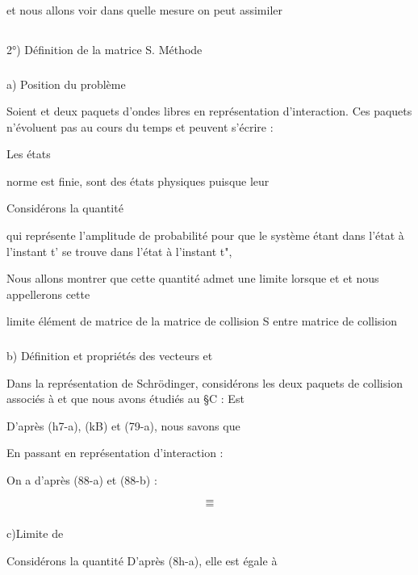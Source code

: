 {{{et nous allons voir dans quelle mesure on peut assimiler 


\subsection{}%
2°) Définition de la matrice S. Méthode

\subsubsection{}%
a) Position du problème

Soient  et  deux paquets d'ondes libres
en représentation d'interaction. Ces paquets n'évoluent pas au
cours du temps et peuvent s'écrire :

Les états 

norme est finie,
 sont des états physiques puisque leur

Considérons la quantité

qui représente l'amplitude de probabilité pour que le système
étant dans l'état  à l'instant t' se trouve dans l'état
à l'instant t",

Nous allons montrer que cette quantité admet une
limite lorsque  et  et nous appellerons cette

limite élément de matrice de la matrice de collision S entre
 matrice de collision 

%

\subsubsection{}%
b) Définition et propriétés des vecteurs  et 

Dans la représentation de Schrödinger, considérons les deux
paquets de collision associés à  et  que nous avons
étudiés au \S C : Est

D'après (h7-a), (kB) et (79-a), nous savons que

En passant en représentation d'interaction :

On a d'après (88-a) et (88-b) :

\[
\tag{89-a}=
\]
\[
\tag{89-b}=
\]


\subsubsection{}%
c)Limite de 

Considérons la quantité
D'après (8h-a), elle est égale à

}}}
